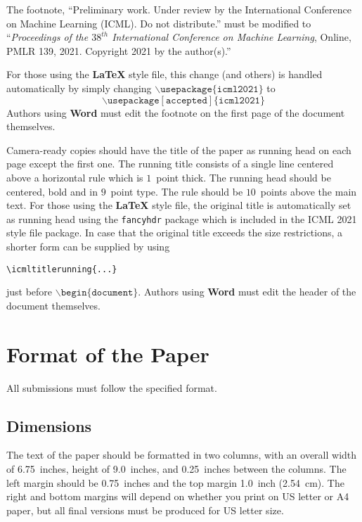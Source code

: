 \documentclass{article}
\begin{document}
The footnote, ``Preliminary work. Under review by the International
Conference on Machine Learning (ICML). Do not distribute.'' must be
modified to ``\textit{Proceedings of the
$\mathit{38}^{th}$ International Conference on Machine Learning},
Online, PMLR 139, 2021.
Copyright 2021 by the author(s).''

For those using the \textbf{\LaTeX} style file, this change (and others) is
handled automatically by simply changing
$\mathtt{\backslash usepackage\{icml2021\}}$ to
$$\mathtt{\backslash usepackage[accepted]\{icml2021\}}$$
Authors using \textbf{Word} must edit the
footnote on the first page of the document themselves.

Camera-ready copies should have the title of the paper as running head
on each page except the first one. The running title consists of a
single line centered above a horizontal rule which is $1$~point thick.
The running head should be centered, bold and in $9$~point type. The
rule should be $10$~points above the main text. For those using the
\textbf{\LaTeX} style file, the original title is automatically set as running
head using the \texttt{fancyhdr} package which is included in the ICML
2021 style file package. In case that the original title exceeds the
size restrictions, a shorter form can be supplied by using

\verb|\icmltitlerunning{...}|

just before $\mathtt{\backslash begin\{document\}}$.
Authors using \textbf{Word} must edit the header of the document themselves.

\section{Format of the Paper}

All submissions must follow the specified format.

\subsection{Dimensions}




The text of the paper should be formatted in two columns, with an
overall width of 6.75~inches, height of 9.0~inches, and 0.25~inches
between the columns. The left margin should be 0.75~inches and the top
margin 1.0~inch (2.54~cm). The right and bottom margins will depend on
whether you print on US letter or A4 paper, but all final versions
must be produced for US letter size.
\end{document}
